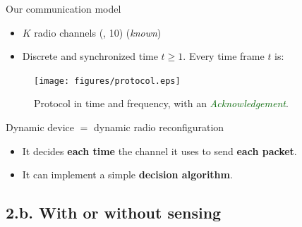 \documentclass[12pt,english,ignorenonframetext,aspectratio=169,]{beamer}
\providecommand{\tightlist}{%
  \setlength{\itemsep}{0pt}\setlength{\parskip}{0pt}}
\begin{document}
\begin{frame}{Our communication model}

\begin{itemize}
\tightlist
\item
  \(K\) radio channels (\eg, 10) \hfill{} (\emph{known})
\item
  Discrete and synchronized time \(t\geq1\). Every time frame \(t\) is:
\end{itemize}

\begin{figure}[h!]
\centering
\texttt{[image: figures/protocol.eps]}
\caption{\small{Protocol in time and frequency, with an \textcolor{darkgreen}{\emph{Acknowledgement}}.}}
\end{figure}

\begin{block}{Dynamic device \(=\) dynamic radio reconfiguration}

\begin{itemize}
\tightlist
\item
  It decides \textbf{each time} the channel it uses to send \textbf{each
  packet}.
\item
  It can implement a simple \textbf{decision algorithm}.
\end{itemize}

\end{block}

\end{frame}



\subsection{\hfill{}2.b. With or without sensing\hfill{}}
\end{document}
